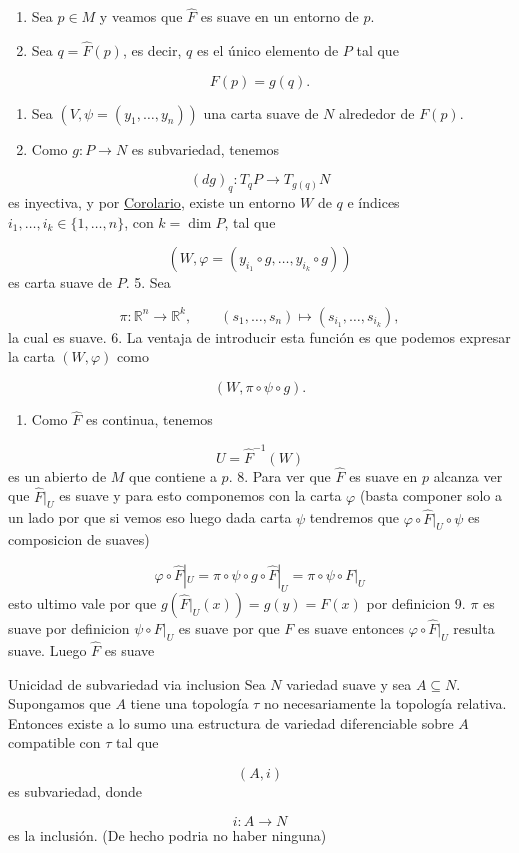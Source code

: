 \begin{bookproof}{}
\begin{enumerate}
\item Sea $p\in M$ y veamos que $\widehat F$ es suave en un entorno de $p$.
\item Sea $q=\widehat F(p)$, es decir, $q$ es el único elemento de $P$ tal que
\end{enumerate}
\[
F(p)=g(q).
\]
\begin{enumerate}[start=3]
\item Sea $(V,\psi=(y_1,\ldots,y_n))$ una carta suave de $N$ alrededor de $F(p)$.
\item Como $g:P\to N$ es subvariedad, tenemos
\end{enumerate}
\[
(dg)_q:T_qP\to T_{g(q)}N
\]
es inyectiva, y por \hyperref[blk:c4d494]{Corolario}, existe un entorno $W$ de $q$ e índices $i_1,\ldots,i_k\in\{1,\ldots,n\}$, con $k=\dim P$, tal que

\[
(W,\varphi=(y_{i_1}\circ g,\ldots,y_{i_k}\circ g))
\]
es carta suave de $P$. 5. Sea

\[
\pi:\mathbb R^n\to\mathbb R^k,\qquad (s_1,\ldots,s_n)\mapsto (s_{i_1},\ldots,s_{i_k}),
\]
la cual es suave. 6. La ventaja de introducir esta función es que podemos expresar la carta $(W,\varphi)$ como

\[
(W,\pi\circ\psi\circ g).
\]
\begin{enumerate}[start=7]
\item Como $\widehat F$ es continua, tenemos
\end{enumerate}
\[
U=\widehat F^{-1}(W)
\]
es un abierto de $M$ que contiene a $p$. 8. Para ver que $\widehat{F}$ es suave en $p$ alcanza ver que $\widehat{F}|_{U}$ es suave y para esto componemos con la carta $\varphi$ (basta componer solo a un lado por que si vemos eso luego dada carta $\psi$ tendremos que $\varphi\circ\widehat{F}|_{U}\circ\psi$ es composicion de suaves)

\[
\varphi\circ\widehat{F}|_{U}=\pi\circ\psi\circ g\circ\widehat{F}|_{U}=\pi\circ\psi\circ F|_{U}
\]
esto ultimo vale por que $g(\widehat{F}|_{U}(x))=g(y)=F(x)$ por definicion 9. $\pi$ es suave por definicion $\psi\circ F|_{U}$ es suave por que $F$ es suave entonces $\varphi\circ\widehat{F}|_{U}$ resulta suave. Luego $\widehat{F}$ es suave

\bookqed
\end{bookproof}
\begin{bookproposition}{Unicidad de subvariedad via inclusion}
Sea $N$ variedad suave y sea $A\subseteq N$. Supongamos que $A$ tiene una topología $\tau$ no necesariamente la topología relativa. Entonces existe a lo sumo una estructura de variedad diferenciable sobre $A$ compatible con $\tau$ tal que

\[
(A,i)
\]
es subvariedad, donde

\[
i:A\to N
\]
es la inclusión. (De hecho podria no haber ninguna)

\end{bookproposition}
